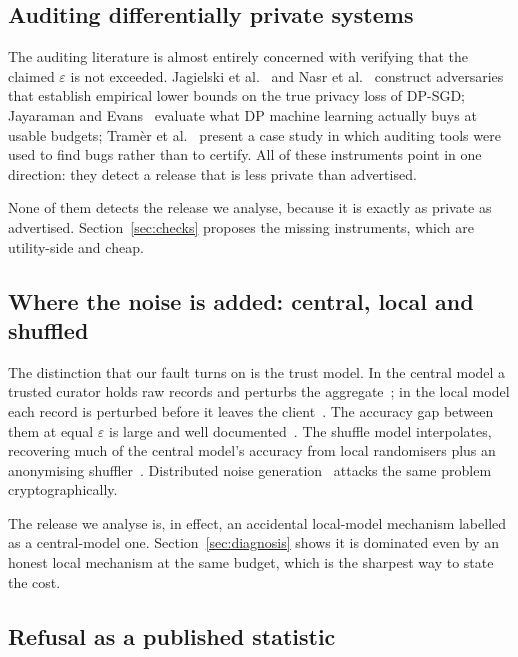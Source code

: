 \documentclass[journal]{IEEEtran}
\theoremstyle{definition}
\begin{document}
\subsection{Auditing differentially private systems}

The auditing literature is almost entirely concerned with verifying that the
claimed $\varepsilon$ is not exceeded. Jagielski et
al.~\cite{jagielski2020auditing} and Nasr et al.~\cite{nasr2021adversary}
construct adversaries that establish empirical lower bounds on the true privacy
loss of DP-SGD; Jayaraman and Evans~\cite{jayaraman2019evaluating} evaluate what
DP machine learning actually buys at usable budgets; Tram\`er et
al.~\cite{tramer2022debugging} present a case study in which auditing tools were
used to find bugs rather than to certify. All of these instruments point in one
direction: they detect a release that is less private than advertised.

None of them detects the release we analyse, because it is exactly as private as
advertised. Section~\ref{sec:checks} proposes the missing instruments, which are
utility-side and cheap.

\subsection{Where the noise is added: central, local and shuffled}

The distinction that our fault turns on is the trust model. In the central model
a trusted curator holds raw records and perturbs the
aggregate~\cite{dwork2006calibrating}; in the local model each record is
perturbed before it leaves the client~\cite{kasiviswanathan2011learn,
warner1965rr, erlingsson2014rappor}. The accuracy gap between them at equal
$\varepsilon$ is large and well documented~\cite{cormode2018practice}. The
shuffle model interpolates, recovering much of the central model's accuracy from
local randomisers plus an anonymising
shuffler~\cite{bittau2017prochlo, erlingsson2019shuffling, cheu2019shuffling,
balle2019blanket}. Distributed noise generation~\cite{dwork2006ourdata} attacks
the same problem cryptographically.

The release we analyse is, in effect, an accidental local-model mechanism
labelled as a central-model one. Section~\ref{sec:diagnosis} shows it is
dominated even by an honest local mechanism at the same budget, which is the
sharpest way to state the cost.

\subsection{Refusal as a published statistic}
\end{document}
